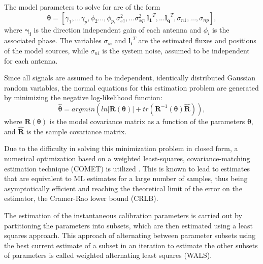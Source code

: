 \documentclass[referee]{aa}
\begin{document}
The model parameters to solve for are of the form
\begin{equation}
\bm{\theta}=[\gamma_{1},\ldots\gamma_{p},\phi_{2}...,\phi_{p,}\sigma_{s1}^{2},...\sigma_{sq}^{2},\mathbf{l_{1}}^{T},...\mathbf{l_{q}}^{T},\sigma_{n1},...,\sigma_{np}],\label{eq:estparam}
\end{equation}
 where $\mathbf{\gamma_{i}}$  is the direction independent gain  of each antenna
 and  $\phi_{i}$  is  the  associated  phase. The  variables  $\sigma_{si}$  and
 $\mathbf{l_i}^{T}$ are the estimated fluxes and positions of the model sources,
 while $\sigma_{ni}$  is the  system noise, assumed  to be independent  for each
 antenna.

Since  all  signals  are  assumed  to be  independent,  identically  distributed
Gaussian random variables, the normal  equations for this estimation problem are
generated by minimizing the negative log-likelihood function:
\begin{equation}
\bm{\hat{\theta}}=argmin\left(ln|\bm{R(\theta)}|+tr(\mathbf{R}^{-1}(\bm{\theta})\mathbf{\widehat{R}})\right),\label{eq:normeq}
\end{equation}
 where  $\bm{R(\theta)}$  is  the  model  covariance  matrix  as  a
 function of  the parameters $\bm{\theta}$,  and $\mathbf{\widehat{R}}$ is
 the sample covariance matrix.

Due to  the difficulty in  solving this minimization  problem in closed  form, a
numerical  optimization based on  a weighted  least-squares,  covariance-matching
estimation technique (COMET)  is utilized \citep{ottersten1998covariance}.  This
is known to  lead to estimates that  are equivalent to ML estimates  for a large
number  of  samples,  thus  being  asymptotically  efficient  and  reaching  the
theoretical  limit of the  error on  the estimator,  the Cramer-Rao  lower bound
(CRLB).

The estimation  of the  instantaneous calibration parameters  is carried  out by
partitioning the parameters into subsets, which are then estimated using a least
squares approach.  This approach  of alternating between parameter subsets using
the best  current estimate  of a subset  in an  iteration to estimate  the other
subsets of parameters is called weighted alternating least squares (WALS).
\end{document}

